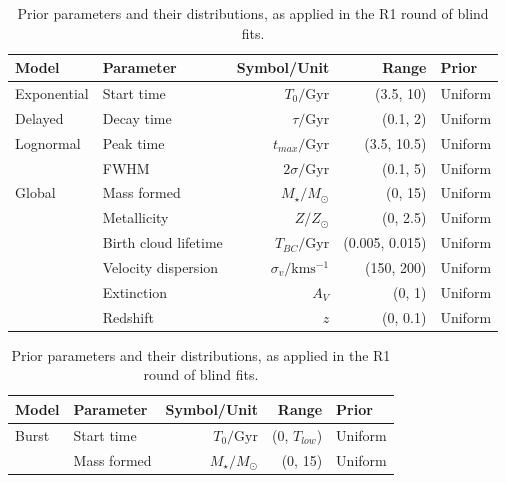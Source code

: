 \documentclass[a4paper,11pt]{article}
\begin{document}
\begin{table}[h]
  \centering
  \begin{tabular}{l l r r l}
    Model       & Parameter            & Symbol/Unit                  & Range          & Prior   \\
    \hline \hline
    Exponential & Start time           & $T_0/\mathrm{Gyr}$           & (3.5, 10)      & Uniform \\
    Delayed     & Decay time           & $\tau/\mathrm{Gyr}$          & (0.1, 2)       & Uniform \\
    \hline
    Lognormal   & Peak time            & $t_{max}/\mathrm{Gyr}$       & (3.5, 10.5)    & Uniform \\
                & FWHM                 & $2\sigma/\mathrm{Gyr}$       & (0.1, 5)       & Uniform \\
    \hline
    Global      & Mass formed          & $M_\star/M_\odot$            & (0, 15)        & Uniform \\
                & Metallicity          & $Z/Z_\odot$                  & (0, 2.5)       & Uniform \\
                & Birth cloud lifetime & $T_{BC}/\mathrm{Gyr}$        & (0.005, 0.015) & Uniform \\
                & Velocity dispersion  & $\sigma_v/\mathrm{kms^{-1}}$ & (150, 200)     & Uniform \\
                & Extinction           & $A_V$                        & (0, 1)         & Uniform \\
                & Redshift             & $z$                          & (0, 0.1)       & Uniform \\
    \hline
  \end{tabular}
  \caption{Prior parameters and their distributions, as applied in the R1 round of blind fits.}
  \label{tab:r1_priors}
\end{table}

\begin{table}[h]
  \centering
  \begin{tabular}{l l r r l}
    Model & Parameter   & Symbol/Unit        & Range           & Prior   \\
    \hline \hline
    Burst & Start time  & $T_0/\mathrm{Gyr}$ & (0, $T_{low}$)  & Uniform \\
          & Mass formed & $M_\star/M_\odot$  & (0, 15)         & Uniform \\
    \hline
  \end{tabular}
  \caption{Prior parameters and their distributions, as applied in the R1 round of blind fits.}
  \label{tab:r1_burst_priors}
\end{table}
\end{document}
